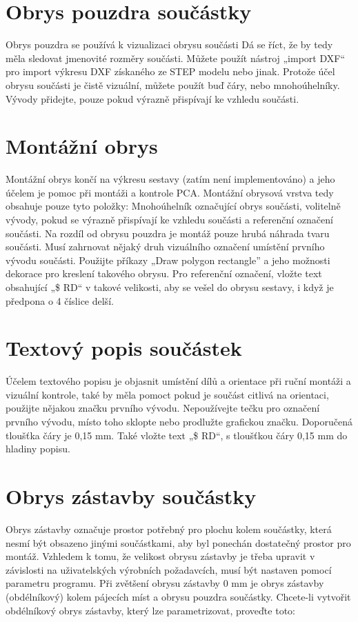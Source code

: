 \documentclass[letterpaper,10pt,czech]{sphinxmanual}
\begin{document}
\section{Obrys pouzdra součástky}
\label{\detokenize{create-package_cz:obrys-pouzdra-soucastky}}
Obrys pouzdra se používá k vizualizaci obrysu součásti
Dá se říct, že by tedy měla sledovat jmenovité rozměry součásti. Můžete použít nástroj „import DXF“ pro import výkresu DXF získaného ze STEP modelu nebo jinak. Protože účel obrysu součásti je čistě
vizuální, můžete použít buď čáry, nebo mnohoúhelníky. Vývody přidejte, pouze pokud
výrazně přispívají ke vzhledu součásti.


\section{Montážní obrys}
\label{\detokenize{create-package_cz:montazni-obrys}}
Montážní obrys končí na výkresu sestavy (zatím není implementováno) a jeho účelem je pomoc při montáži a kontrole PCA. Montážní obrysová vrstva tedy obsahuje pouze tyto položky: Mnohoúhelník označující obrys součásti, volitelně vývody, pokud se výrazně přispívají ke vzhledu součásti a referenční označení součásti. Na rozdíl od obrysu pouzdra je montáž pouze hrubá náhrada tvaru součásti. Musí zahrnovat nějaký druh vizuálního označení umístění prvního vývodu součásti. Použijte příkazy  „Draw polygon rectangle” a jeho možnosti dekorace pro kreslení takového obrysu. Pro referenční označení, vložte text obsahující „\$ RD“ v takové velikosti, aby se vešel do obrysu sestavy, i když je předpona o 4 číslice delší.


\section{Textový popis součástek}
\label{\detokenize{create-package_cz:textovy-popis-soucastek}}
Účelem textového popisu je objasnit umístění dílů a orientace při ruční montáži a vizuální kontrole, také by měla pomoct pokud je součást citlivá na orientaci, použijte nějakou značku prvního vývodu. Nepoužívejte tečku pro označení prvního vývodu, místo toho sklopte nebo prodlužte grafickou značku. Doporučená tloušťka čáry je 0,15 mm. Také vložte text „\$ RD“, s tloušťkou čáry 0,15 mm do hladiny popisu.


\section{Obrys zástavby součástky}
\label{\detokenize{create-package_cz:obrys-zastavby-soucastky}}
Obrys zástavby označuje prostor potřebný pro plochu kolem součástky, která nesmí být obsazeno jinými součástkami, aby byl ponechán dostatečný prostor pro montáž. Vzhledem k tomu, že velikost obrysu zástavby je třeba upravit v závislosti na uživatelských výrobních požadavcích, musí být nastaven pomocí parametru
programu. Při zvětšení obrysu zástavby 0 mm je obrys zástavby (obdélníkový) kolem pájecích míst a obrysu pouzdra součástky. Chcete-li vytvořit obdélníkový obrys zástavby, který lze parametrizovat, proveďte toto:
\end{document}
